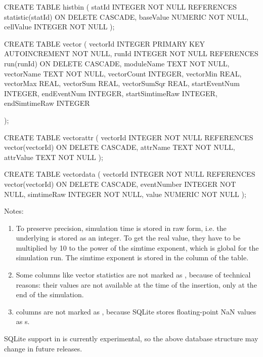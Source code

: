 \begin{filelisting}
CREATE TABLE histbin 
( 
    statId        INTEGER NOT NULL REFERENCES statistic(statId) ON DELETE CASCADE, 
    baseValue     NUMERIC NOT NULL, 
    cellValue     INTEGER NOT NULL 
); 

CREATE TABLE vector 
( 
    vectorId        INTEGER PRIMARY KEY AUTOINCREMENT NOT NULL, 
    runId           INTEGER  NOT NULL REFERENCES run(runId) ON DELETE CASCADE, 
    moduleName      TEXT NOT NULL, 
    vectorName      TEXT NOT NULL, 
    vectorCount     INTEGER,
    vectorMin       REAL, 
    vectorMax       REAL, 
    vectorSum       REAL, 
    vectorSumSqr    REAL, 
    startEventNum   INTEGER, 
    endEventNum     INTEGER, 
    startSimtimeRaw INTEGER, 
    endSimtimeRaw   INTEGER 

); 

CREATE TABLE vectorattr 
( 
    vectorId      INTEGER NOT NULL REFERENCES vector(vectorId) ON DELETE CASCADE, 
    attrName      TEXT NOT NULL, 
    attrValue     TEXT NOT NULL 
); 

CREATE TABLE vectordata 
( 
    vectorId      INTEGER NOT NULL REFERENCES vector(vectorId) ON DELETE CASCADE, 
    eventNumber   INTEGER NOT NULL, 
    simtimeRaw    INTEGER NOT NULL, 
    value         NUMERIC NOT NULL 
); 
\end{filelisting}

Notes:

\begin{enumerate}
  \item To preserve precision, simulation time is stored in raw form, i.e. 
        the underlying  is stored as an integer. To get the real
        value, they have to be multiplied by 10 to the power of the simtime
        exponent, which is global for the simulation run. The simtime        
        exponent is stored  in the  column of the 
        table.
  \item Some columns like vector statistics are not marked as ,
        because of technical reasons: their values are not available at the
        time of the insertion, only at the end of the simulation.
  \item {} columns are not marked as , because
        SQLite stores floating-point NaN values as s.
\end{enumerate}

\begin{caution}
SQLite support in {\opp} is currently experimental, so the above database
structure may change in future releases.
\end{caution}

